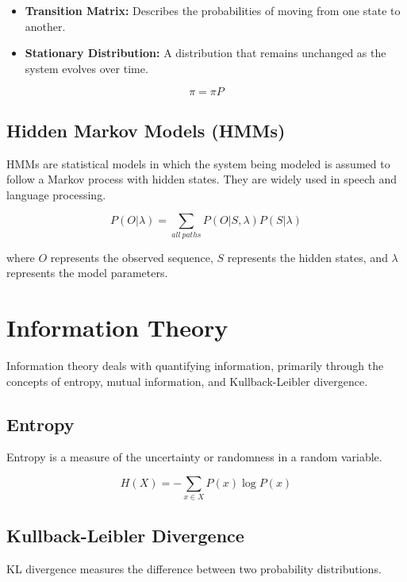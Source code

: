 \begin{itemize}
    \item \textbf{Transition Matrix:} Describes the probabilities of moving from one state to another.
    \item \textbf{Stationary Distribution:} A distribution that remains unchanged as the system evolves over time.
\end{itemize}

\begin{equation}
\pi = \pi P
\end{equation}

\subsection{Hidden Markov Models (HMMs)}
HMMs are statistical models in which the system being modeled is assumed to follow a Markov process with hidden states. They are widely used in speech and language processing.

\begin{equation}
P(O| \lambda) = \sum_{all\ paths} P(O|S, \lambda)P(S|\lambda)
\end{equation}

where \( O \) represents the observed sequence, \( S \) represents the hidden states, and \( \lambda \) represents the model parameters.

\section{Information Theory}
Information theory deals with quantifying information, primarily through the concepts of entropy, mutual information, and Kullback-Leibler divergence.

\subsection{Entropy}
Entropy is a measure of the uncertainty or randomness in a random variable.

\begin{equation}
H(X) = -\sum_{x \in X} P(x) \log P(x)
\end{equation}

\subsection{Kullback-Leibler Divergence}
KL divergence measures the difference between two probability distributions.

